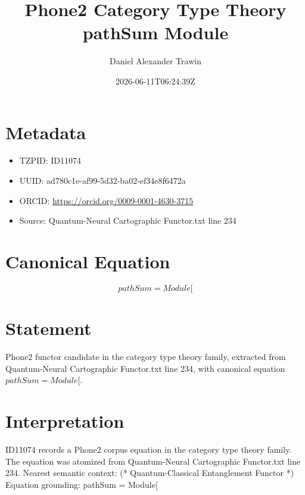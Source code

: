 \documentclass[11pt]{article}
\title{Phone2 Category Type Theory pathSum Module}
\author{Daniel Alexander Trawin}
\date{2026-06-11T06:24:39Z}
\begin{document}
\maketitle
\section*{Metadata}
\begin{itemize}
\item TZPID: ID11074
\item UUID: ad780c1e-af99-5d32-ba02-ef34e8f6472a
\item ORCID: \url{https://orcid.org/0009-0001-4630-3715}
\item Source: Quantum-Neural Cartographic Functor.txt line 234
\end{itemize}
\section*{Canonical Equation}
\[
pathSum = Module[
\]
\section*{Statement}
Phone2 functor candidate in the category type theory family, extracted from Quantum-Neural Cartographic Functor.txt line 234, with canonical equation $pathSum = Module[$.
\section*{Interpretation}
ID11074 records a Phone2 corpus equation in the category type theory family. The equation was atomized from Quantum-Neural Cartographic Functor.txt line 234. Nearest semantic context: (* Quantum-Classical Entanglement Functor *) Equation grounding: pathSum = Module[
\end{document}
